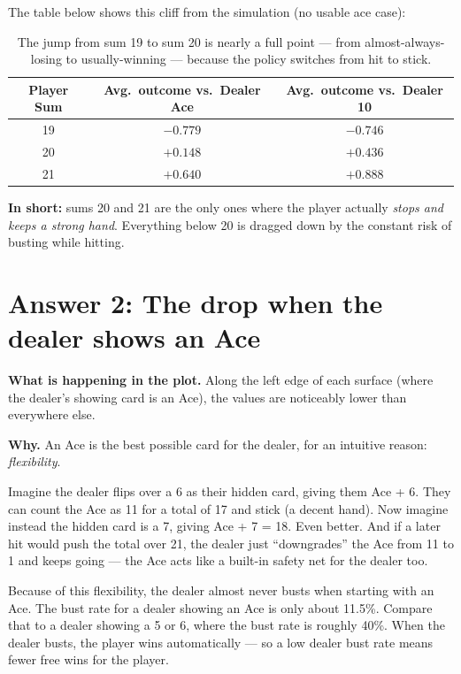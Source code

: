 \documentclass[11pt]{article}
\begin{document}
The table below shows this cliff from the simulation (no usable ace case):

\begin{table}[ht]
    \centering
    \begin{tabular}{ccc}
        \toprule
        Player Sum & Avg.\ outcome vs.\ Dealer Ace & Avg.\ outcome vs.\ Dealer 10 \\
        \midrule
        19 & $-0.779$ & $-0.746$ \\
        20 & $+0.148$ & $+0.436$ \\
        21 & $+0.640$ & $+0.888$ \\
        \bottomrule
    \end{tabular}
    \caption{The jump from sum 19 to sum 20 is nearly a full point --- from almost-always-losing to usually-winning --- because the policy switches from hit to stick.}
\end{table}

\textbf{In short:} sums 20 and 21 are the only ones where the player actually \textit{stops and keeps a strong hand}. Everything below 20 is dragged down by the constant risk of busting while hitting.

\section*{Answer 2: The drop when the dealer shows an Ace}

\textbf{What is happening in the plot.} Along the left edge of each surface (where the dealer's showing card is an Ace), the values are noticeably lower than everywhere else.

\textbf{Why.} An Ace is the best possible card for the dealer, for an intuitive reason: \textit{flexibility}.

Imagine the dealer flips over a 6 as their hidden card, giving them Ace + 6. They can count the Ace as 11 for a total of 17 and stick (a decent hand). Now imagine instead the hidden card is a 7, giving Ace + 7 = 18. Even better. And if a later hit would push the total over 21, the dealer just ``downgrades'' the Ace from 11 to 1 and keeps going --- the Ace acts like a built-in safety net for the dealer too.

Because of this flexibility, the dealer almost never busts when starting with an Ace. The bust rate for a dealer showing an Ace is only about 11.5\%. Compare that to a dealer showing a 5 or 6, where the bust rate is roughly 40\%. When the dealer busts, the player wins automatically --- so a low dealer bust rate means fewer free wins for the player.
\end{document}
